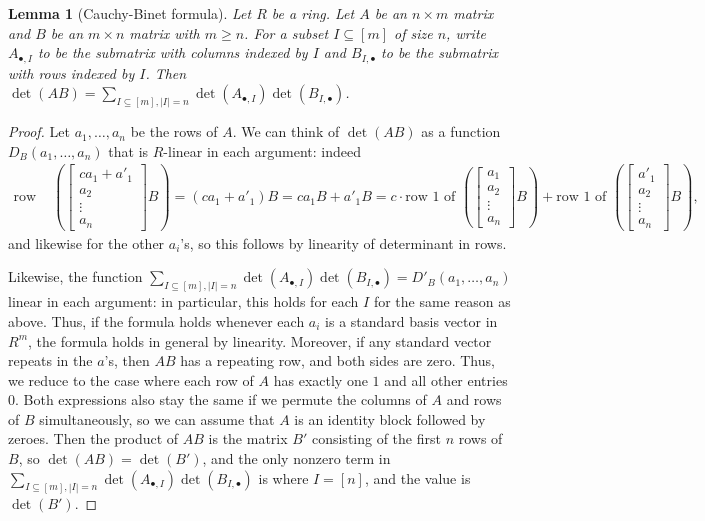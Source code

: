 \documentclass{amsart}[12pt]
\numberwithin{equation}{section}
\theoremstyle{plain} %
\newtheorem{lem}[equation]{Lemma}
\theoremstyle{definition}
\theoremstyle{remark}
\begin{document}
\begin{lem}[Cauchy-Binet formula] Let $R$ be a ring. Let $A$ be an $n\times m$ matrix and $B$ be an $m\times n$ matrix with $m\geq n$. For a subset $I\subseteq [m]$ of size $n$, write $A_{\bullet,I}$ to be the submatrix with columns indexed by $I$ and $B_{I,\bullet}$ to be the submatrix with rows indexed by $I$. Then $\det(AB) = \sum_{I\subseteq [m], |I|=n} \det(A_{\bullet,I}) \det(B_{I,\bullet})$.
\end{lem}
\begin{proof}
Let $a_1,\dots,a_n$ be the rows of $A$. We can think of $\det(AB)$ as a function $D_B(a_1,\dots,a_n)$ that is $R$-linear in each argument: indeed
\[ \begin{aligned} \text{row 1 of }&\left( \begin{bmatrix} ca_1+a'_1 \\ a_2 \\ \vdots \\ a_n \end{bmatrix} B \right) = (ca_1 + a'_1)  B = c a_1 B + a'_1 B =  c \cdot \text{row 1 of } \left(\begin{bmatrix} a_1 \\ a_2 \\ \vdots \\ a_n \end{bmatrix} B\right)  +  \text{row 1 of } \left( \begin{bmatrix} a'_1 \\ a_2 \\ \vdots \\ a_n \end{bmatrix} B \right),  \end{aligned}\]
and likewise for the other $a_i$'s, so this follows by linearity of determinant in rows.
 
 Likewise, the function $\sum_{I\subseteq [m], |I|=n} \det(A_{\bullet,I}) \det(B_{I,\bullet})=D'_B(a_1,\dots,a_n)$ linear in each argument: in particular, this holds for each $I$ for the same reason as above. Thus, if the formula holds whenever each $a_i$ is a standard basis vector in $R^m$, the formula holds in general by linearity. Moreover, if any standard vector repeats in the $a$'s, then $AB$ has a repeating row, and both sides are zero. Thus, we reduce to the case where each row of $A$ has exactly one $1$ and all other entries $0$. Both expressions also stay the same if we permute the columns of $A$ and rows of $B$ simultaneously, so we can assume that $A$ is an identity block followed by zeroes. Then the product of $AB$ is the matrix $B'$ consisting of the first $n$ rows of $B$, so $\det(AB)=\det(B')$, and the only nonzero term in $\sum_{I\subseteq [m], |I|=n} \det(A_{\bullet,I}) \det(B_{I,\bullet})$ is where $I=[n]$, and the value is $\det(B')$.
\end{proof}
\end{document}
